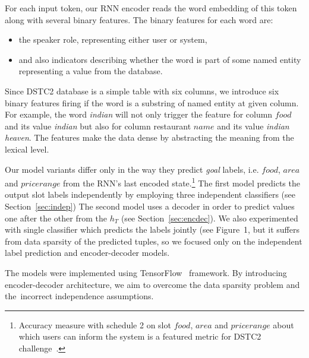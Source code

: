 \documentclass{itatnew}
\begin{document}
For each input token, our RNN encoder reads the word embedding of this token along with several binary features. 
The binary features for each word are:
\begin{itemize}
	\item the speaker role, representing either user or system,
    \item and also indicators describing whether the word is part of some named entity representing a value from the database.
\end{itemize}
Since DSTC2 database is a simple table with six columns, we introduce six binary features firing if the word is a substring of named entity at given column.
For example, the word {\it indian} will not only trigger the feature for column $food$ and its value {\it indian} but also for column restaurant $name$ and its value {\it indian heaven}.
The features make the data dense by abstracting the meaning from the lexical level. 

Our model variants differ only in the way they predict {\it goal} labels, i.e. $food$, $area$ and $price range$ from the RNN's last encoded state.\footnote{Accuracy measure with schedule 2 on slot $food$, $area$ and $price range$ about which users can inform the system is a featured metric for DSTC2 challenge~\cite{henderson2014second}.} 
The first model predicts the output slot labels independently by employing three independent classifiers (see Section~\ref{sec:indep})
The second model uses a decoder in order to predict values one after the other from the $h_{T}$ (see Section~\ref{sec:encdec}).
We also experimented with single classifier which predicts the labels jointly (see Figure~1, but it suffers from data sparsity of the predicted tuples, so we focused only on the independent label prediction and encoder-decoder models.

The models were implemented using TensorFlow~\cite{abaditensorflow} framework. 
By introducing encoder-decoder architecture, we aim to overcome the data sparsity problem and the~incorrect independence assumptions.
\end{document}
